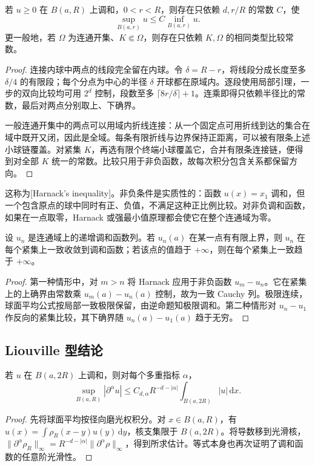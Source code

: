 \begin{theorem}[Harnack]\label{b2:thm:13-harnack}
若 \(u\geq0\) 在 \(B(a,R)\) 上调和，\(0<r<R\)，则存在只依赖 \(d,r/R\) 的常数 \(C\)，使
\[
 \sup_{B(a,r)}u\leq C\inf_{B(a,r)}u.
\]
更一般地，若 \(\Omega\) 为连通开集、\(K\Subset\Omega\)，则存在只依赖 \(K,\Omega\) 的相同类型比较常数。
\end{theorem}
\begin{proof}
连接内球中两点的线段完全留在内球。令 \(\delta=R-r\)，将线段分成长度至多 \(\delta/4\) 的有限段；每个分点为中心的半径 \(\delta\) 开球都在原域内。逐段使用局部引理，一步的双向比较均可用 \(2^d\) 控制，段数至多 \(\lceil8r/\delta\rceil+1\)。连乘即得只依赖半径比的常数，最后对两点分别取上、下确界。

一般连通开集中的两点可以用域内折线连接：从一个固定点可用折线到达的集合在域中既开又闭，因此是全域。每条有限折线与边界保持正距离，可以被有限条上述小球链覆盖。对紧集 \(K\)，再选有限个终端小球覆盖它，合并有限条连接链，便得到对全部 \(K\) 统一的常数。比较只用于非负函数，故每次积分包含关系都保留方向。
\end{proof}

这称为[Harnack's inequality]。非负条件是实质性的：函数 \(u(x)=x_1\) 调和，但一个包含原点的球中同时有正、负值，不满足这种正比例比较。对非负调和函数，如果在一点取零，Harnack 或强最小值原理都会使它在整个连通域为零。

\begin{corollary}\label{b2:cor:13-harnack-convergence}
设 \(u_n\) 是连通域上的递增调和函数列。若 \(u_n(a)\) 在某一点有有限上界，则 \(u_n\) 在每个紧集上一致收敛到调和函数；若该点的值趋于 \(+\infty\)，则在每个紧集上一致趋于 \(+\infty\)。
\end{corollary}
\begin{proof}
第一种情形中，对 \(m>n\) 将 Harnack 应用于非负函数 \(u_m-u_n\)。它在紧集上的上确界由常数乘 \(u_m(a)-u_n(a)\) 控制，故为一致 Cauchy 列。极限连续，球面平均公式按局部一致极限保留，由逆命题知极限调和。第二种情形对 \(u_n-u_1\) 作反向的紧集比较，其下确界随 \(u_n(a)-u_1(a)\) 趋于无穷。
\end{proof}

\subsection{Liouville 型结论}
\label{b2:subsec:130104}

\begin{proposition}[内部导数估计]\label{b2:prop:13-interior-derivatives}
若 \(u\) 在 \(B(a,2R)\) 上调和，则对每个多重指标 \(\alpha\)，
\[
 \sup_{B(a,R)}|\partial^\alpha u|
 \leq C_{d,\alpha}R^{-d-|\alpha|}\int_{B(a,2R)}|u|\,\mathrm{d}x.
\]
\end{proposition}
\begin{proof}
先将球面平均按径向磨光权积分。对 \(x\in B(a,R)\)，有 \(u(x)=\int\rho_R(x-y)u(y)\,\mathrm{d}y\)，核支集限于 \(B(a,2R)\)。将导数移到光滑核，\(\|\partial^\alpha\rho_R\|_\infty=R^{-d-|\alpha|}\|\partial^\alpha\rho\|_\infty\)，得到所求估计。等式本身也再次证明了调和函数的任意阶光滑性。
\end{proof}


